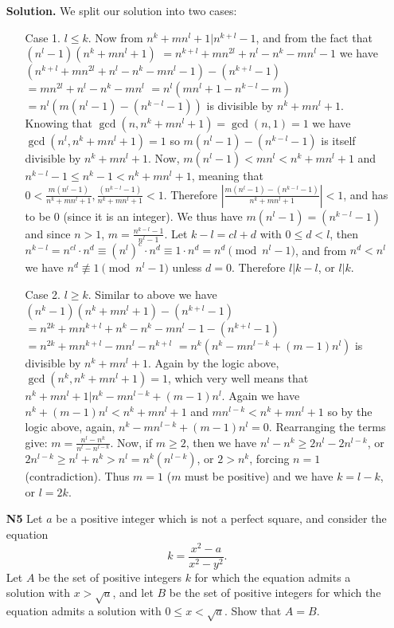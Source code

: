 \documentclass[11pt,a4paper]{article}
\begin{document}
\begin{itemize}
\textbf{Solution.} We split our solution into two cases: 
\begin{itemize}
\item[Case 1.] $l\le k$. 
Now from $n^k + mn^l + 1|n^{k+l} - 1$, and from the fact that $(n^l-1)(n^k + mn^l + 1)$
$=n^{k+l}+mn^{2l}+n^l-n^k-mn^l-1$ we have 
$(n^{k+l}+mn^{2l}+n^l-n^k-mn^l-1)-(n^{k+l} - 1)$
$=mn^{2l}+n^l-n^k-mn^l$
$=n^l(mn^{l}+1-n^{k-l}-m)$
$=n^l(m(n^l-1)-(n^{k-l}-1))$
is divisible by $n^k + mn^l + 1$. 
Knowing that $\gcd(n, n^k + mn^l + 1)=\gcd(n, 1)=1$ we have 
$\gcd(n^l, n^k + mn^l + 1)=1$ 
so $m(n^l-1)-(n^{k-l}-1)$ is itself divisible by $n^k + mn^l + 1$. 
Now, $m(n^l-1)<mn^l<n^k + mn^l + 1$ and $n^{k-l}-1\le n^k-1<n^k + mn^l + 1$, meaning that 
$0<\frac{m(n^l-1)}{n^k + mn^l + 1}, \frac{(n^{k-l}-1)}{n^k + mn^l + 1}<1$. 
Therefore $|\frac{m(n^l-1)-(n^{k-l}-1)}{n^k + mn^l + 1}|<1$, and has to be 0 (since it is an integer). 
We thus have 
$m(n^l-1)=(n^{k-l}-1)$ and since $n>1$, 
$m=\frac{n^{k-l}-1}{n^l-1}$. 
Let $k-l=cl+d$ with $0\le d<l$, then $n^{k-l}=n^{cl}\cdot n^d\equiv(n^l)^c\cdot n^d\equiv 1\cdot n^d=n^d\pmod{n^l-1}$, 
and from $n^d<n^l$ we have $n^d\not\equiv 1\pmod{n^l-1}$ unless $d=0$. 
Therefore $l|k-l$, or $l|k$. 

\item[Case 2.] $l\ge k$. 
Similar to above we have 
$(n^k-1)(n^k + mn^l + 1)-(n^{k+l}-1)$
$=n^{2k}+mn^{k+l}+n^k-n^k-mn^l-1-(n^{k+l}-1)$
$=n^{2k}+mn^{k+l}-mn^l-n^{k+l}$
$=n^k(n^k-mn^{l-k}+(m-1)n^l)$ 
is divisible by $n^k + mn^l + 1$. 
Again by the logic above, 
$\gcd (n^k, n^k + mn^l + 1)=1$, 
which very well means that $n^k + mn^l + 1|n^k-mn^{l-k}+(m-1)n^l$. 
Again we have $n^k+(m-1)n^l<n^k+mn^l+1$ and $mn^{l-k}<n^k+mn^l+1$ so by the logic above, again, 
$n^k-mn^{l-k}+(m-1)n^l=0$. 
Rearranging the terms give: 
$m=\frac{n^l-n^k}{n^l-n^{l-k}}$. 
Now, if $m\ge 2$, then we have 
$n^l-n^k\ge 2n^l-2n^{l-k}$, or 
$2n^{l-k}\ge n^l+n^k > n^l=n^k(n^{l-k})$, 
or $2>n^k$, forcing $n=1$ (contradiction). 
Thus $m=1$ ($m$ must be positive) and we have $k=l-k$, or $l=2k$. 
\end{itemize}

\newpage

\item[\textbf{N5}]
Let $a$ be a positive integer which is not a perfect square, and consider the equation \[k = \frac{x^2-a}{x^2-y^2}.\]Let $A$ be the set of positive integers $k$ for which the equation admits a solution with $x>\sqrt{a}$, and let $B$ be the set of positive integers for which the equation admits a solution with $0\leq x<\sqrt{a}$. Show that $A=B$.


\end{itemize}
\end{document}
